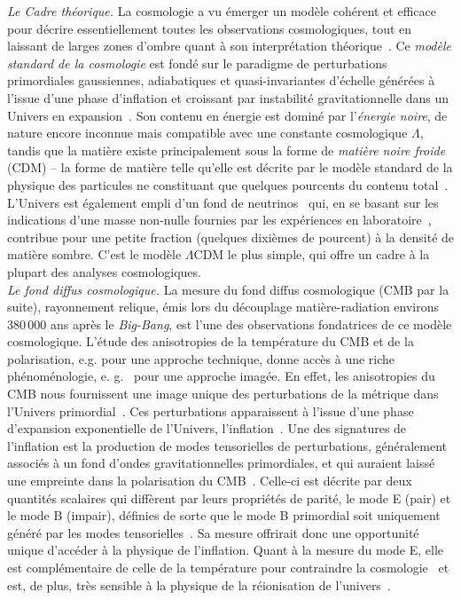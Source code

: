 

\emph{Le Cadre théorique.} La cosmologie a vu émerger un modèle cohérent et efficace
pour décrire essentiellement toutes les observations cosmologiques,
tout en laissant de larges zones d'ombre quant à son interprétation
théorique~. Ce \emph{modèle standard de la cosmologie} est
fondé sur le paradigme de perturbations primordiales gaussiennes,
adiabatiques et quasi-invariantes d'échelle générées à l'issue d'une
phase d'inflation et croissant par instabilité gravitationnelle dans
un Univers en expansion~. Son contenu en énergie est
dominé par l'\emph{énergie noire}, de nature encore inconnue mais
compatible avec une constante cosmologique $\Lambda$, tandis
que la matière existe principalement sous la forme de
\emph{matière noire froide} (CDM) -- la forme de matière telle qu'elle
est décrite par le modèle standard de la physique des particules ne
constituant que quelques pourcents du contenu
total~. L'Univers est également empli d'un fond de
neutrinos~ qui, en se basant sur les indications d'une
masse non-nulle fournies par les expériences en laboratoire~,
contribue pour une petite fraction (quelques dixièmes de pourcent) à
la densité de matière sombre. C'est le modèle $\Lambda$CDM le plus
simple, qui offre un cadre à la plupart des analyses cosmologiques.\\


\emph{Le fond diffus cosmologique.} La mesure du fond diffus
cosmologique (CMB par la suite), rayonnement relique, émis lors du
découplage matière-radiation environs 380\,000
ans après le \emph{Big-Bang}, est l'une des observations fondatrices
de ce modèle cosmologique. L'étude des anisotropies de la température
du CMB et de la polarisation, e.g.  pour
une approche technique, donne accès à une riche phénoménologie,
e. g.~ pour une approche imagée. En effet, les
anisotropies du CMB nous fournissent une image unique des
perturbations de la métrique dans
l'Univers primordial~. Ces perturbations
apparaissent à l'issue d'une phase d'expansion exponentielle de
l'Univers, l'inflation~. Une des signatures de
l'inflation est la production de modes tensorielles de perturbations,
généralement associés à un fond d'ondes gravitationnelles
primordiales, et qui auraient laissé une empreinte dans la
polarisation du CMB~. Celle-ci est décrite par deux
quantités scalaires qui diffèrent par leurs propriétés de parité, le
mode E (pair) et le mode B (impair), définies de sorte que le mode B
primordial soit uniquement généré par les modes
tensorielles~. Sa mesure offrirait donc une
opportunité unique d'accéder à la physique de l'inflation. Quant à la
mesure du mode E, elle est complémentaire de celle de la température
pour contraindre la cosmologie~ et est, de plus, très sensible
à la physique de la réionisation de l'univers~.\\

